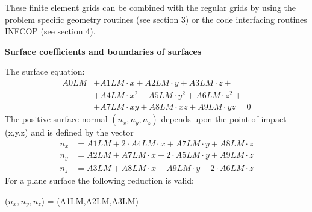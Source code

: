 \begin{description}
        These finite element grids can be combined with the regular grids by using the
        problem specific geometry routines (see section 3) or the code interfacing
        routines INFCOP (see section 4).
\end{description}

\medskip

\textbf{Surface coefficients and boundaries of surfaces} 

\medskip 

The surface equation:
\begin{align}
  A0LM & + A1LM  \cdot	x + A2LM \cdot y + A3LM  \cdot z +  \nonumber        \\
       & + A4LM  \cdot x^2 + A5LM  \cdot y^2 + A6LM  \cdot z^2 + \nonumber \\
       & + A7LM  \cdot xy + A8LM  \cdot xz + A9LM  \cdot yz = 0
\end{align}
The positive surface normal $(n_x, n_y, n_z)$ depends upon the point of impact
(x,y,z) and is defined by the vector
\begin{align}
  n_x & = A1LM  + 2  \cdot
  A4LM  \cdot  x	  + A7LM  \cdot  y    +      A8LM \cdot  z    \nonumber \\
  n_y & = A2LM	  +
  A7LM	\cdot  x    +	  2  \cdot   A5LM  \cdot  y    +
  A9LM	\cdot  z   \nonumber
  \\
  n_z & = A3LM	  +
  A8LM	\cdot  x +  A9LM  \cdot  y +
  2  \cdot   A6LM  \cdot  z	  \nonumber
\end{align}
For a plane surface the following reduction is valid:

($n_x, n_y, n_z$) = (A1LM,A2LM,A3LM) 

\medskip 

